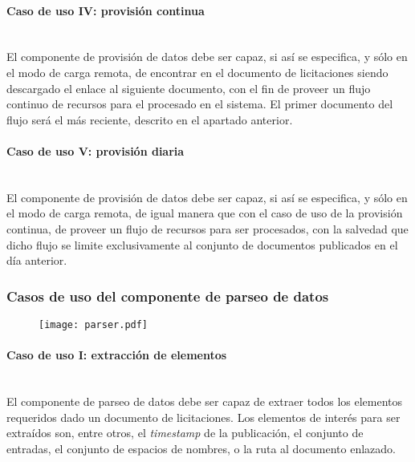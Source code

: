             \paragraph{Caso de uso IV: provisión continua} \mbox{}\\
                El componente de provisión de datos debe ser capaz, si así se especifica, y sólo en el modo de carga remota, de encontrar en el documento de licitaciones siendo descargado el enlace al siguiente documento, con el fin de proveer un flujo continuo de recursos para el procesado en el sistema. El primer documento del flujo será el más reciente, descrito en el apartado anterior.
                
            \paragraph{Caso de uso V: provisión diaria} \mbox{}\\
                El componente de provisión de datos debe ser capaz, si así se especifica, y sólo en el modo de carga remota, de igual manera que con el caso de uso de la provisión continua, de proveer un flujo de recursos para ser procesados, con la salvedad que dicho flujo se limite exclusivamente al conjunto de documentos publicados en el día anterior.
                
        \subsubsection{Casos de uso del componente de parseo de datos}
    
            \begin{figure}[h]
                \centering
                \texttt{[image: parser.pdf]}
                \label{fig:parser}
            \end{figure}
            
            \paragraph{Caso de uso I: extracción de elementos} \mbox{}\\
                El componente de parseo de datos debe ser capaz de extraer todos los elementos requeridos dado un documento de licitaciones. Los elementos de interés para ser extraídos son, entre otros, el \textit{timestamp} de la publicación, el conjunto de entradas, el conjunto de espacios de nombres, o la ruta al documento enlazado.
                
